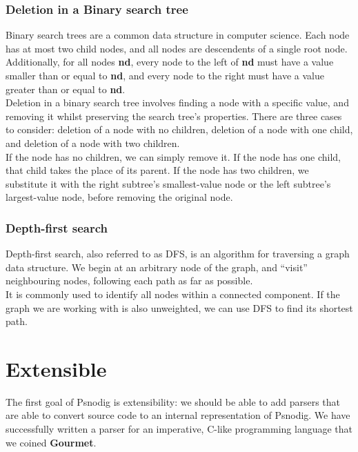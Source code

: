 \subsubsection{Deletion in a Binary search tree}

Binary search trees are a common data structure in computer science. Each node has at most two child nodes, and all nodes are descendents of a single root node. Additionally, for all nodes \textbf{nd}, every node to the left of \textbf{nd} must have a value smaller than or equal to \textbf{nd}, and every node to the right must have a value greater than or equal to \textbf{nd}. \\

Deletion in a binary search tree involves finding a node with a specific value, and removing it whilst preserving the search tree's properties. There are three cases to consider: deletion of a node with no children, deletion of a node with one child, and deletion of a node with two children. \\

If the node has no children, we can simply remove it. If the node has one child, that child takes the place of its parent. If the node has two children, we substitute it with the right subtree's smallest-value node or the left subtree's largest-value node, before removing the original node.

\subsubsection{Depth-first search}

Depth-first search, also referred to as DFS, is an algorithm for traversing a graph data structure. We begin at an arbitrary node of the graph, and ``visit'' neighbouring nodes, following each path as far as possible. \\

It is commonly used to identify all nodes within a connected component. If the graph we are working with is also unweighted, we can use DFS to find its shortest path.

\section{Extensible}

The first goal of Psnodig is extensibility: we should be able to add parsers that are able to convert source code to an internal representation of Psnodig. We have successfully written a parser for an imperative, C-like programming language that we coined \textbf{Gourmet}.

